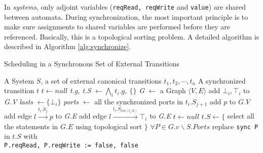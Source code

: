 In \lang{} \emph{systems}, only adjoint variables (\texttt{reqRead, reqWrite} and \texttt{value}) are shared between automata. During synchronization, the most important principle is to make sure assignments to shared variables are performed before they are referenced. Basically, this is a topological sorting problem. A detailed algorithm is described in Algorithm \ref{alg:synchronize}.

\begin{algorithm}[t]
    \caption{Scheduling in a Synchronous Set of External Transitions}
    \label{alg:synchronize}
    \begin{algorithmic}[1]
        \REQUIRE A System $S$, a set of external canonical transitions $t_1,t_2,\cdots,t_n$
        \ENSURE A synchronized transition $t$
            \STATE $t\leftarrow null$
            \RETURN
        \ENDIF
        \STATE \emph{t.g, t.S} $\leftarrow \bigwedge_i t_i.g,\:\{\}$
        \STATE 
        \STATE  \emph{G} $\leftarrow$ a Graph $\langle V,E\rangle$
            \STATE add $\bot_i, \top_i$ to \emph{G.V}
            \STATE \emph{lasts} $\leftarrow\{\bot_i\}$
                \STATE \emph{ports} $\leftarrow$ all the synchronized ports in $t_i.S_{j+1}$
                        \STATE add $p$ to $G.V$
                    \ENDIF
                    \STATE add edge $l \xrightarrow{t_i.S_j} p$ to \emph{G.E}
                \ENDFOR 
            \ENDFOR
                \STATE add edge $l \xrightarrow{t_i.S_{len(t_i.S)}} \top_i$ to \emph{G.E}
            \ENDFOR 
        \ENDFOR
        \STATE
            \STATE $t\leftarrow null$
        \ELSE
            \STATE $t.S\leftarrow\{$ select all the statements in $G.E$ using topological sort $\}$
            \STATE $\forall P\in G.v\backslash S.Ports$ replace \texttt{sync P} in $t.S$ with \\ \hspace{1em} \texttt{P.reqRead, P.reqWrite := false, false}
        \ENDIF
    \end{algorithmic}
\end{algorithm}

